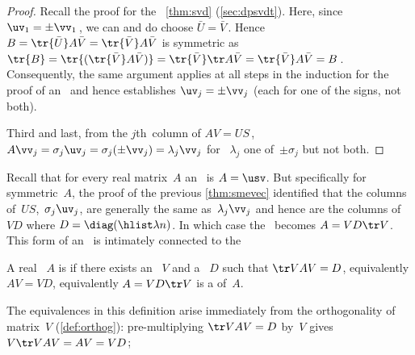 \begin{proof}
Recall the  proof for the \svd\ \cref{thm:svd}  (\cref{sec:dpsvdt}).  
Here, since \(\uv_1=\pm\vv_1\)\,, we can and do choose \(\bar U=\bar V\)\,.  
Hence \(B=\tr{\bar U}A\bar V =\tr{\bar V}A\bar V \) is symmetric as \(\tr{B} =\tr{(\tr{\bar V}A\bar V)} =\tr{\bar V}\tr A\bar V =\tr{\bar V}A\bar V =B\)\,.
Consequently, the same argument applies at all steps in the induction for the proof of an \svd\ and hence establishes \(\uv_j=\pm\vv_j\) (each for one of the signs, not both).

Third and last,  from the \(j\)th~column of \(AV=US\)\,, \(A\vv_j=\sigma_j\uv_j=\sigma_j(\pm \vv_j)=\lambda_j\vv_j\) for ~\(\lambda_j\) one of~\(\pm \sigma_j\) but not both.
\end{proof}

\begin{comment}
For duplicated \idx{singular value}s, there are \idx{eigenvector}s in the span of the \idx{singular vector}s.  
But appears difficult to prove.  
Could come down to solutions of \(Q^2=I\) for orthogonal matrix~\(Q\).
Equivalent to proving the Fundamental Theorem of Algebra that there are \(n\)~zeros of an \(n\)th~degree polynomial \pooliv{p.D8}.
\end{comment}


Recall that for every real matrix~\(A\) an \svd\ is \(A=\usv\).
But specifically for symmetric~\(A\), the proof of the previous \cref{thm:smevec} identified that the columns of~\(US\),~\(\sigma_j\uv_j\), are generally the same as~\(\lambda_j\vv_j\) and hence are the columns of~\(VD\) where \(D=\diag(\hlist\lambda n)\).
In which case the \svd\ becomes \(A=VD\tr V\).
This form of an \svd\ is intimately connected to the 


\begin{definition} \label{def:odsble} 
A real ~\(A\) is  if there exists an ~\(V\) and a ~\(D\) such that \(\tr VAV=D\), equivalently \(AV=VD\), equivalently \(A=VD\tr V\) is a  of~\(A\).
\end{definition}

The equivalences in this definition arise immediately from the orthogonality of matrix~\(V\) (\cref{def:orthog}): pre-multiplying \(\tr VAV=D\) by~\(V\) gives \(V\tr VAV=AV=VD\); 

